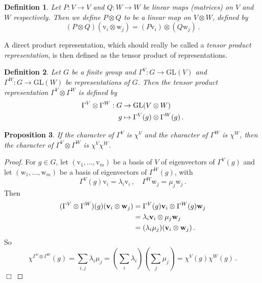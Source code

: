 \documentclass{article}
\theoremstyle{plain}\theoremheaderfont{\normalfont\itshape}\theorembodyfont{\rmfamily}\theoremseparator{.}\newtheorem*{rem}{Remark}\newtheorem*{ex}{Example}\newtheorem*{proof}{Proof}\newtheorem*{altp}{Alternative proof}
\theoremstyle{plain}\theoremheaderfont{\normalfont\bfseries}\theorembodyfont{\rmfamily}\theoremseparator{.}\newtheorem{thm}{Theorem}[section]\newtheorem{lem}[thm]{Lemma}\newtheorem{prop}[thm]{Proposition}\newtheorem*{cor}{Corollary}\newtheorem{defn}[thm]{Definition}\newtheorem{clm}[thm]{Claim}\newtheorem{clminproof}{Claim}\newtheorem*{law}{Law}\newtheorem{pos}[thm]{Postulate}
\theoremstyle{break}\theoremheaderfont{\normalfont\itshape}\theorembodyfont{\rmfamily}\theoremseparator{.\medskip}\newtheorem*{proofskip}{Proof}\newtheorem*{exs}{Examples}\newtheorem*{rems}{Remarks}
\theoremstyle{break}\theoremheaderfont{\normalfont\bfseries}\theorembodyfont{\rmfamily}\theoremseparator{.\medskip}\newtheorem{lemskip}[thm]{Lemma}\newtheorem{defnskip}[thm]{Definition}\newtheorem{propskip}[thm]{Proposition}\newtheorem{thmskip}[thm]{Theorem}
\numberwithin{equation}{section}
\newcommand{\qed}{\hfill\ensuremath{\Box}}
\newcommand{\vb}[1]{\bm{\mathrm{#1}}}
\newcommand{\GL}{\mathrm{GL}}
\begin{document}
    \begin{defn}
        Let \(P:V\to V\) and \(Q:W\to W\) be linear maps (matrices) on \(V\) and \(W\) respectively. Then we define \(P\otimes Q\) to be a linear map on \(V\otimes W\), defined by
        \begin{equation}
            (P\otimes Q)(\vb{v}_i\otimes\vb{w}_j)=(P\vb{v}_i)\otimes(Q\vb{w}_j)\,.
        \end{equation}
    \end{defn}

    A direct product representation, which should really be called a \textit{tensor product representation}, is then defined as the tensor product of representations.
    \begin{defn}
        Let \(G\) be a finite group and \(\Gamma^V:G\to\GL(V)\) and \(\Gamma^W:G\to\GL(W)\) be representations of \(G\). Then the \textit{tensor product representation} \(\Gamma^V\otimes\Gamma^W\) is defined by
        \begin{align}
            \Gamma^V\otimes\Gamma^W:G&\to\GL(V\otimes W)\notag\\
            g&\mapsto\Gamma^V(g)\otimes\Gamma^W(g)\,.
        \end{align}
    \end{defn}
    \begin{prop}
        If the character of \(\Gamma^V\) is \(\chi^V\) and the character of \(\Gamma^W\) is \(\chi^W\), then the character of \(\Gamma^{V}\otimes\Gamma^{W}\) is \(\chi^V\chi^W\).
    \end{prop}
    \begin{proof}
        For \(g\in G\), let \((\vb{v}_1,\dots,\vb{v}_m)\) be a basis of \(V\) of eigenvectors of \(\Gamma^V(g)\) and let \((\vb{w}_1,\dots,\vb{w}_m)\) be a basis of eigenvectors of \(\Gamma^W(g)\), with
        \begin{equation}
            \Gamma^V(g)\vb{v}_i=\lambda_i\vb{v}_i\,,\quad\Gamma^W\vb{w}_j=\mu_j\vb{w}_j\,.
        \end{equation}
        Then
        \begin{align}
            (\Gamma^V\otimes\Gamma^W)(g)(\vb{v}_i\otimes\vb{w}_j)&=\Gamma^V(g)\vb{v}_i\otimes\Gamma^W(g)\vb{w}_j \notag\\
            &=\lambda_i\vb{v}_i\otimes\mu_j\vb{w}_j \notag\\
            &=(\lambda_i\mu_j)(\vb{v}_i\otimes\vb{w}_j)\,.
        \end{align}
        So
        \begin{equation}
            \chi^{\Gamma^V\otimes\Gamma^W}(g)=\sum_{i,j}\lambda_i\mu_j=\left(\sum_i\lambda_i\right)\left(\sum_j\mu_j\right)=\chi^{V}(g)\chi^W(g)\,.
        \end{equation}\qed
    \end{proof}
\end{document}
